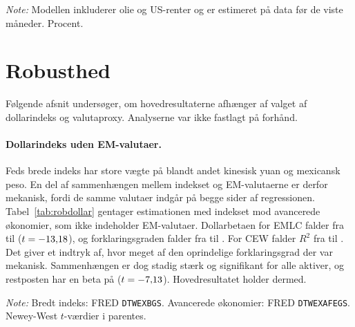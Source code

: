 \documentclass[11pt,a4paper]{article}
\begin{document}
\begin{table}[!htb]
\centering
\small
\begin{threeparttable}
\caption{Faktiske og modelforventede afkast i den seneste episode}
\label{tab:ep}

\begin{tablenotes}\footnotesize
\item \textit{Note:} Modellen inkluderer olie og US-renter og er estimeret på data før de viste måneder. Procent.
\end{tablenotes}
\end{threeparttable}
\end{table}

\section{Robusthed}\label{sec:rob}

Følgende afsnit undersøger, om hovedresultaterne afhænger af valget af dollarindeks og valutaproxy. Analyserne var ikke fastlagt på forhånd.

\paragraph{Dollarindeks uden EM-valutaer.} Feds brede indeks har store vægte på blandt andet kinesisk yuan og mexicansk peso. En del af sammenhængen mellem indekset og EM-valutaerne er derfor mekanisk, fordi de samme valutaer indgår på begge sider af regressionen. Tabel~\ref{tab:robdollar} gentager estimationen med indekset mod avancerede økonomier, som ikke indeholder EM-valutaer. Dollarbetaen for EMLC falder fra \BetaEMLC{} til \AfeEMLC{} ($t=-13{,}18$), og forklaringsgraden falder fra \RtoEMLC{} til \AfeRtoEMLC. For CEW falder $R^2$ fra \BredRtoCEW{} til \AfeRtoCEW. Det giver et indtryk af, hvor meget af den oprindelige forklaringsgrad der var mekanisk. Sammenhængen er dog stadig stærk og signifikant for alle aktiver, og restposten har en beta på \AfeLok{} ($t=-7{,}13$). Hovedresultatet holder dermed.

\begin{table}[!htb]
\centering
\small
\begin{threeparttable}
\caption{Dollarbetaer med to dollarindeks}
\label{tab:robdollar}

\begin{tablenotes}\footnotesize
\item \textit{Note:} Bredt indeks: FRED \texttt{DTWEXBGS}. Avancerede økonomier: FRED \texttt{DTWEXAFEGS}. Newey-West $t$-værdier i parentes.
\end{tablenotes}
\end{threeparttable}
\end{table}
\end{document}
